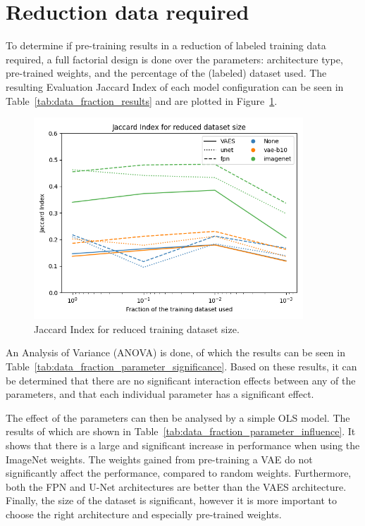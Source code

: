 

\section{Reduction data required}
To determine if pre-training results in a reduction of labeled training data required, a full factorial design is done over the parameters: architecture type, pre-trained weights, and the percentage of the (labeled) dataset used. The resulting Evaluation Jaccard Index of each model configuration can be seen in Table~\ref{tab:data_fraction_results} and are plotted in Figure~\ref{fig:dataset-fraction-results}.


\begin{figure}[h]
    \centering
    \includegraphics[width=0.9\textwidth]{figures/data_percentage/line-plot.png}
    \caption{Jaccard Index for reduced training dataset size.}
    \label{fig:dataset-fraction-results}
\end{figure}

An Analysis of Variance (ANOVA) is done, of which the results can be seen in Table~\ref{tab:data_fraction_parameter_significance}. Based on these results, it can be determined that there are no significant interaction effects between any of the parameters, and that each individual parameter has a significant effect.


The effect of the parameters can then be analysed by a simple OLS model. The results of which are shown in Table~\ref{tab:data_fraction_parameter_influence}. It shows that there is a large and significant increase in performance when using the ImageNet weights. The weights gained from pre-training a VAE do not significantly affect the performance, compared to random weights. Furthermore, both the FPN and U-Net architectures are better than the VAES architecture. Finally, the size of the dataset is significant, however it is more important to choose the right architecture and especially pre-trained weights.


